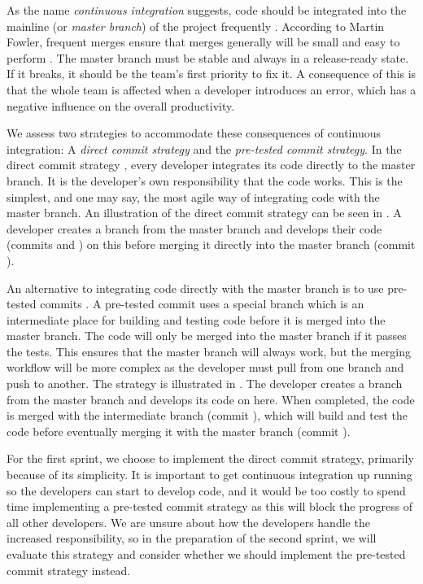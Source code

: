 As the name \emph{continuous integration} suggests, code should be integrated into the mainline (or \emph{master branch}) of the project frequently \parencite{fowlerCI}. According to Martin Fowler, frequent merges ensure that merges generally will be small and easy to perform \parencite{fowlerFeatureBranch}. The master branch must be stable and always in a release-ready state. If it breaks, it should be the team's first priority to fix it. A consequence of this is that the whole team is affected when a developer introduces an error, which has a negative influence on the overall productivity.

We assess two strategies to accommodate these consequences of continuous integration: A \emph{direct commit strategy} and the \emph{pre-tested commit strategy}. In the direct commit strategy \parencite{git_branching_workflows2015}, every developer integrates its code directly to the master branch. It is the developer's own responsibility that the code works. This is the simplest, and one may say, the most agile way of integrating code with the master branch. An illustration of the direct commit strategy can be seen in . A developer creates a branch from the master branch and develops their code (commits  and ) on this before merging it directly into the master branch (commit ).

An alternative to integrating code directly with the master branch is to use pre-tested commits \parencite{fowlerPendingHead}. A pre-tested commit uses a special branch which is an intermediate place for building and testing code before it is merged into the master branch. The code will only be merged into the master branch if it passes the tests. This ensures that the master branch will always work, but the merging workflow will be more complex as the developer must pull from one branch and push to another. The strategy is illustrated in . The developer creates a branch from the master branch and develops its code on here. When completed, the code is merged with the intermediate branch (commit \emph{}), which will build and test the code before eventually merging it with the master branch (commit ).

For the first sprint, we choose to implement the direct commit strategy, primarily because of its simplicity. It is important to get continuous integration up running so the developers can start to develop code, and it would be too costly to spend time implementing a pre-tested commit strategy as this will block the progress of all other developers. We are unsure about how the developers handle the increased responsibility, so in the preparation of the second sprint, we will evaluate this strategy and consider whether we should implement the pre-tested commit strategy instead.

